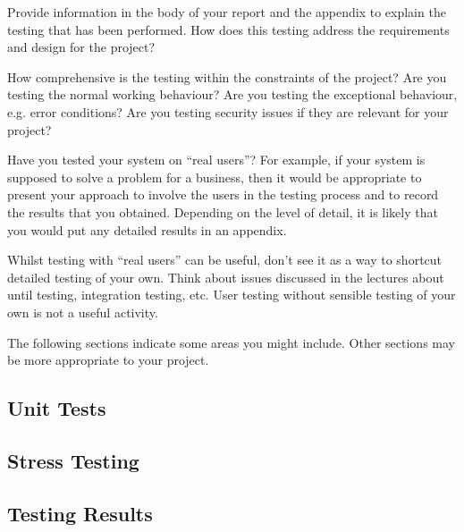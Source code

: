 Provide information in the body of your report and the appendix to explain the testing that has been performed. How does this testing address the requirements and design for the project?

How comprehensive is the testing within the constraints of the project?  Are you testing the normal working behaviour? Are you testing the exceptional behaviour, e.g. error conditions? Are you testing security issues if they are relevant for your project?

Have you tested your system on ``real users''? For example, if your system is supposed to solve a problem for a business, then it would be appropriate to present your approach to involve the users in the testing process and to record the results that you obtained. Depending on the level of detail, it is likely that you would put any detailed results in an appendix. 

Whilst testing with ``real users'' can be useful, don't see it as a way to shortcut detailed testing of your own. Think about issues discussed in the lectures about until testing, integration testing, etc. User testing without sensible testing of your own is not a useful activity.

The following sections indicate some areas you might include. Other sections may be more appropriate to your project. 

\subsection{Unit Tests}

\subsection{Stress Testing}

\subsection{Testing Results}
